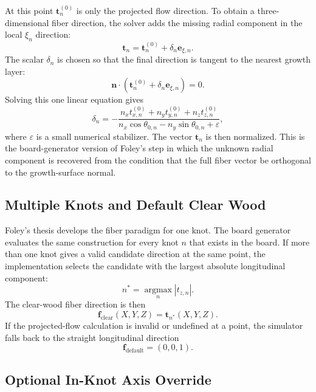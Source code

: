 \documentclass[11pt]{article}
\begin{document}
At this point $\bm{t}^{(0)}_n$ is only the projected flow direction. To obtain a three-dimensional fiber
direction, the solver adds the missing radial component in the local $\xi_n$ direction:
\begin{equation}
\bm{t}_n
=
\bm{t}^{(0)}_n+\delta_n\bm{e}_{\xi,n}.
\end{equation}
The scalar $\delta_n$ is chosen so that the final direction is tangent to the nearest growth layer:
\begin{equation}
\bm{n}\cdot
\left(
\bm{t}^{(0)}_n+\delta_n\bm{e}_{\xi,n}
\right)
=0.
\end{equation}
Solving this one linear equation gives
\begin{equation}
\delta_n
=
-\frac{
n_x t^{(0)}_{x,n}
+n_y t^{(0)}_{y,n}
+n_z t^{(0)}_{z,n}
}{
n_x\cos\theta_{0,n}-n_y\sin\theta_{0,n}+\varepsilon
},
\end{equation}
where $\varepsilon$ is a small numerical stabilizer. The vector $\bm{t}_n$ is then normalized. This is the
board-generator version of Foley's step in which the unknown radial component is recovered from the condition
that the full fiber vector be orthogonal to the growth-surface normal.

\subsection{Multiple Knots and Default Clear Wood}

Foley's thesis develops the fiber paradigm for one knot. The board generator evaluates the same construction
for every knot $n$ that exists in the board. If more than one knot gives a valid candidate direction at the
same point, the implementation selects the candidate with the largest absolute longitudinal component:
\begin{equation}
n^\ast
=
\operatorname*{argmax}_n |t_{z,n}|.
\end{equation}
The clear-wood fiber direction is then
\begin{equation}
\bm{f}_{\mathrm{clear}}(X,Y,Z)
=
\bm{t}_{n^\ast}(X,Y,Z).
\end{equation}
If the projected-flow calculation is invalid or undefined at a point, the simulator falls back to the straight
longitudinal direction
\begin{equation}
\bm{f}_{\mathrm{default}}=(0,0,1).
\end{equation}

\subsection{Optional In-Knot Axis Override}
\end{document}

